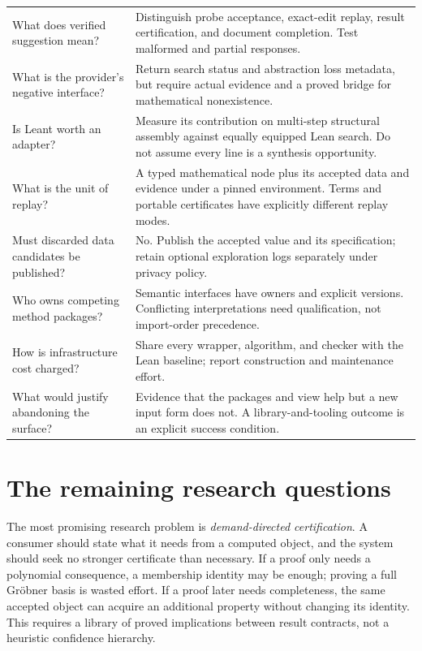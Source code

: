 \documentclass[11pt,a4paper]{article}
\newcommand{\code}[1]{\texttt{\detokenize{#1}}}
\theoremstyle{remark}
\begin{document}
\begin{longtable}{@{}L{.30\textwidth}L{.62\textwidth}@{}}
What does verified suggestion mean? & Distinguish probe acceptance, exact-edit
replay, result certification, and document completion. Test malformed and
partial responses.\\
What is the provider's negative interface? & Return search status and abstraction
loss metadata, but require actual evidence and a proved bridge for mathematical
nonexistence.\\
Is Leant worth an adapter? & Measure its contribution on multi-step structural
assembly against equally equipped Lean search. Do not assume every
\code{exact} line is a synthesis opportunity.\\
What is the unit of replay? & A typed mathematical node plus its accepted data and
evidence under a pinned environment. Terms and portable certificates have
explicitly different replay modes.\\
Must discarded data candidates be published? & No. Publish the accepted value and
its specification; retain optional exploration logs separately under privacy
policy.\\
Who owns competing method packages? & Semantic interfaces have owners and explicit
versions. Conflicting interpretations need qualification, not import-order
precedence.\\
How is infrastructure cost charged? & Share every wrapper, algorithm, and checker
with the Lean baseline; report construction and maintenance effort.\\
What would justify abandoning the surface? & Evidence that the packages and view
help but a new input form does not. A library-and-tooling outcome is an explicit
success condition.\\
\bottomrule
\end{longtable}

\section{The remaining research questions}
\label{sec:research}
The most promising research problem is \emph{demand-directed certification}.
A consumer should state what it needs from a computed object, and the system
should seek no stronger certificate than necessary. If a proof only needs a
polynomial consequence, a membership identity may be enough; proving a full
Gr\"obner basis is wasted effort. If a proof later needs completeness, the same
accepted object can acquire an additional property without changing its identity.
This requires a library of proved implications between result contracts, not a
heuristic confidence hierarchy.
\end{document}
